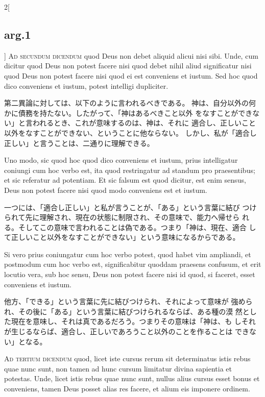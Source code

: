 \documentclass[paper=a4paper,fontsize=10pt,jafontsize=9pt,titlepage]{jlreq}
\begin{document}
\begin{paracol}{2}[\subsection{arg.1}]
{\scshape Ad secundum dicendum} quod Deus non debet
aliquid alicui nisi sibi. Unde, cum dicitur quod Deus non potest facere
nisi quod debet nihil aliud significatur nisi quod Deus non potest
facere nisi quod ei est conveniens et iustum. Sed hoc quod dico
conveniens et iustum, potest intelligi dupliciter.

\switchcolumn

第二異論に対しては、以下のように言われるべきである。
神は、自分以外の何かに債務を持たない。したがって、「神はあるべきこと以外
 をなすことができない」と言われるとき、これが意味するのは、神は、それに
 適合し、正しいこと以外をなすことができない、ということに他ならない。
しかし、私が「適合し正しい」と言うことは、二通りに理解できる。

\switchcolumn*

Uno modo, sic quod
hoc quod dico conveniens et iustum, prius intelligatur coniungi cum hoc
verbo est, ita quod restringatur ad standum pro praesentibus; et sic
referatur ad potentiam. 
Et sic falsum est quod dicitur, est enim sensus,
Deus non potest facere nisi quod modo conveniens est et iustum.

\switchcolumn

一つには、「適合し正しい」と私が言うことが、「ある」という言葉に結び
 つけられて先に理解され、現在の状態に制限され、その意味で、能力へ帰せら
 れる。そしてこの意味で言われることは偽である。つまり「神は、現在、適合
 して正しいこと以外をなすことができない」という意味になるからである。

\switchcolumn*

Si vero
prius coniungatur cum hoc verbo potest, quod habet vim ampliandi, et
postmodum cum hoc verbo est, significabitur quoddam praesens confusum,
et erit locutio vera, sub hoc sensu, Deus non potest facere nisi id
quod, si faceret, esset conveniens et iustum.

\switchcolumn

他方、「できる」という言葉に先に結びつけられ、それによって意味が
 強められ、その後に「ある」という言葉に結びつけられるならば、ある種の漠
 然とした現在を意味し、それは真であるだろう。つまりその意味は「神は、も
 しそれが生じるならば、適合し、正しいであろうこと以外のことを作ることは
 できない」となる。

\switchcolumn*[\subsection{ad.3}]

{\scshape Ad tertium dicendum} quod, licet iste cursus
rerum sit determinatus istis rebus quae nunc sunt, non tamen ad hunc
cursum limitatur divina sapientia et potestas. Unde, licet istis rebus
quae nunc sunt, nullus alius cursus esset bonus et conveniens, tamen
Deus posset alias res facere, et alium eis imponere ordinem.


\end{paracol}
\end{document}
